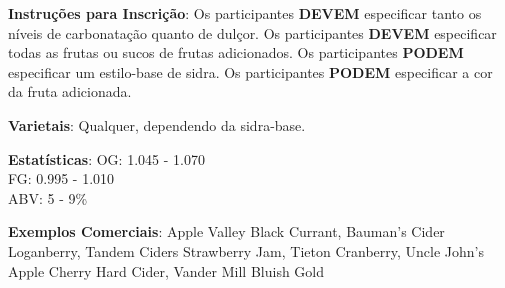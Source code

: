 \textbf{Instruções para Inscrição}: Os participantes \textbf{DEVEM} especificar tanto os níveis de carbonatação quanto de dulçor. Os participantes \textbf{DEVEM} especificar todas as frutas ou sucos de frutas adicionados. Os participantes \textbf{PODEM} especificar um estilo-base de sidra. Os participantes \textbf{PODEM} especificar a cor da fruta adicionada.

\textbf{Varietais}: Qualquer, dependendo da sidra-base.

\textbf{Estatísticas}: OG: 1.045 - 1.070 \\
\phantom{ } \hspace{16.5mm} FG: 0.995 - 1.010 \\
\phantom{ } \hspace{16.5mm} ABV: 5 - 9\%

\textbf{Exemplos Comerciais}: Apple Valley Black Currant, Bauman's Cider Loganberry, Tandem Ciders Strawberry Jam, Tieton Cranberry, Uncle John's Apple Cherry Hard Cider, Vander Mill Bluish Gold